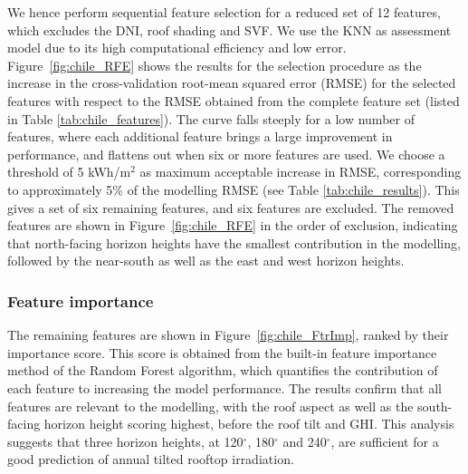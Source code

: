 We hence perform sequential feature selection for a reduced set of 12 features, which excludes the DNI, roof shading and SVF. We use the KNN as assessment model due to its high computational efficiency and low error. Figure~\ref{fig:chile_RFE} shows the results for the selection procedure as the increase in the cross-validation root-mean squared error (RMSE) for the selected features with respect to the RMSE obtained from the complete feature set (listed in Table \ref{tab:chile_features}). The curve falls steeply for a low number of features, where each additional feature brings a large improvement in performance, and flattens out when six or more features are used. We choose a threshold of 5 kWh/m$^2$ as maximum acceptable increase in RMSE, corresponding to approximately 5\% of the modelling RMSE (see Table \ref{tab:chile_results}). This gives a set of six remaining features, and six features are excluded. The removed features are shown in Figure~\ref{fig:chile_RFE} in the order of exclusion, indicating that north-facing horizon heights have the smallest contribution in the modelling, followed by the near-south as well as the east and west horizon heights.

\subsubsection{Feature importance}
The remaining features are shown in Figure~\ref{fig:chile_FtrImp}, ranked by their importance score. This score is obtained from the built-in feature importance method of the Random Forest algorithm, which quantifies the contribution of each feature to increasing the model performance. The results confirm that all features are relevant to the modelling, with the roof aspect as well as the south-facing horizon height scoring highest, before the roof tilt and GHI. This analysis suggests that three horizon heights, at 120$^\circ$, 180$^\circ$ and 240$^\circ$, are sufficient for a good prediction of annual tilted rooftop irradiation.

